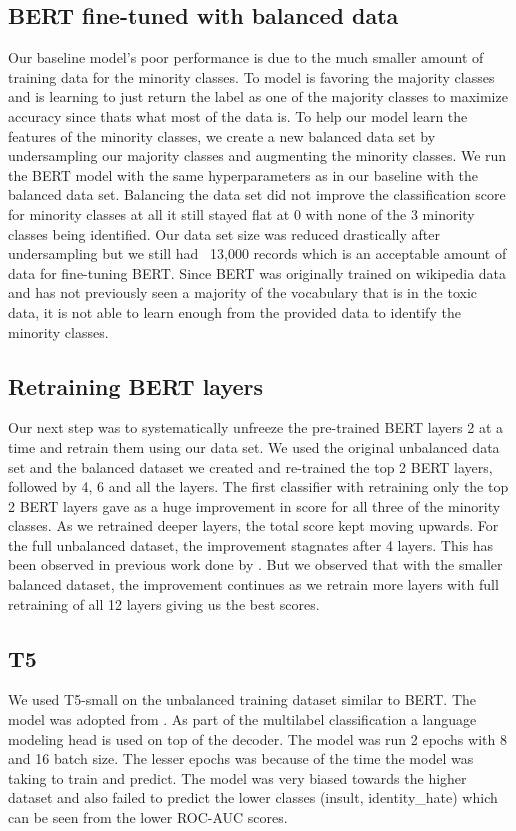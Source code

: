 \documentclass[11pt,a4paper]{article}
\begin{document}
\subsection{BERT fine-tuned with balanced data}
Our baseline model's poor performance is due to the much smaller amount of training data for the minority classes. To model is favoring the majority classes and is learning to just return the label as one of the majority classes to maximize accuracy since thats what most of the data is. To help our model learn the features of the minority classes, we create a new balanced data set by undersampling our majority classes and augmenting the minority classes. We run the BERT model with the same hyperparameters as in our baseline with the balanced data set.
Balancing the data set did not improve the classification score for minority classes at all it still stayed flat at 0 with none of the 3 minority classes being identified. Our data set size was reduced drastically after undersampling but we still had ~13,000 records which is an acceptable amount of data for fine-tuning BERT.
Since BERT was originally trained on wikipedia data and has not previously seen a majority of the vocabulary that is in the toxic data, it is not able to learn enough from the provided data to identify the minority classes. 


\subsection{Retraining BERT layers}
Our next step was to systematically unfreeze the pre-trained BERT layers 2 at a time and retrain them using our data set. We used the original unbalanced data set and the balanced dataset we created and re-trained the top 2 BERT layers, followed by 4, 6 and all the layers.
The first classifier with retraining only the top 2 BERT layers gave as a huge improvement in score for all three of the minority classes. As we retrained deeper layers, the total score kept moving upwards. For the full unbalanced dataset, the improvement stagnates after 4 layers. This has been observed in previous work done by \cite{Singh2020HowMD}. But we observed that with the smaller balanced dataset, the improvement continues as we retrain more layers with full retraining of all 12 layers giving us the best scores.


\subsection{T5}
We used T5-small \cite{raffel2020exploring} on the unbalanced training dataset similar to BERT. The model was adopted from \cite{t5mlcode}. As part of the multilabel classification a language modeling head is used on top of the decoder. The model was run 2 epochs with 8 and 16 batch size. The lesser epochs was because of the time the model was taking to train and predict. The model was very biased towards the higher dataset and also failed to predict the lower classes (insult, identity\_hate) which can be seen from the lower ROC-AUC scores.
\end{document}
